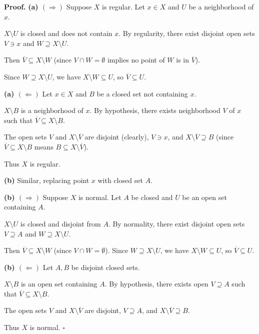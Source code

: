 \documentclass[11pt]{report}
\renewenvironment{proof}[1][Proof]{\noindent\textbf{#1.} }{\hfill$\square$\par\vspace{5pt}}
\begin{document}
\begin{proof}
\textbf{(a) $(\Rightarrow)$} Suppose $X$ is regular. Let $x \in X$ and $U$ be a neighborhood of $x$.

$X \setminus U$ is closed and does not contain $x$. By regularity, there exist disjoint open sets $V \ni x$ and $W \supseteq X \setminus U$.

Then $\overline{V} \subseteq X \setminus W$ (since $V \cap W = \emptyset$ implies no point of $W$ is in $\overline{V}$).

Since $W \supseteq X \setminus U$, we have $X \setminus W \subseteq U$, so $\overline{V} \subseteq U$.

\textbf{(a) $(\Leftarrow)$} Let $x \in X$ and $B$ be a closed set not containing $x$.

$X \setminus B$ is a neighborhood of $x$. By hypothesis, there exists neighborhood $V$ of $x$ such that $\overline{V} \subseteq X \setminus B$.

The open sets $V$ and $X \setminus \overline{V}$ are disjoint (clearly), $V \ni x$, and $X \setminus \overline{V} \supseteq B$ (since $\overline{V} \subseteq X \setminus B$ means $B \subseteq X \setminus \overline{V}$).

Thus $X$ is regular.

\textbf{(b)} Similar, replacing point $x$ with closed set $A$.

\textbf{(b) $(\Rightarrow)$} Suppose $X$ is normal. Let $A$ be closed and $U$ be an open set containing $A$.

$X \setminus U$ is closed and disjoint from $A$. By normality, there exist disjoint open sets $V \supseteq A$ and $W \supseteq X \setminus U$.

Then $\overline{V} \subseteq X \setminus W$ (since $V \cap W = \emptyset$). Since $W \supseteq X \setminus U$, we have $X \setminus W \subseteq U$, so $\overline{V} \subseteq U$.

\textbf{(b) $(\Leftarrow)$} Let $A, B$ be disjoint closed sets.

$X \setminus B$ is an open set containing $A$. By hypothesis, there exists open $V \supseteq A$ such that $\overline{V} \subseteq X \setminus B$.

The open sets $V$ and $X \setminus \overline{V}$ are disjoint, $V \supseteq A$, and $X \setminus \overline{V} \supseteq B$.

Thus $X$ is normal.
\end{proof}

\end{document}
